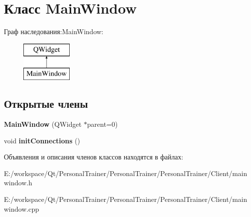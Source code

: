 \hypertarget{class_main_window}{}\section{Класс Main\+Window}
\label{class_main_window}
Граф наследования\+:Main\+Window\+:\begin{figure}[H]
\begin{center}
\leavevmode
\includegraphics[height=2.000000cm]{class_main_window}
\end{center}
\end{figure}
\subsection*{Открытые члены}
\begin{DoxyCompactItemize}
\item 
\hypertarget{class_main_window_a8b244be8b7b7db1b08de2a2acb9409db}{}\label{class_main_window_a8b244be8b7b7db1b08de2a2acb9409db} 
{\bfseries Main\+Window} (Q\+Widget $\ast$parent=0)
\item 
\hypertarget{class_main_window_aecba599b372d9fdf89dfbc1f4a060019}{}\label{class_main_window_aecba599b372d9fdf89dfbc1f4a060019} 
void {\bfseries init\+Connections} ()
\end{DoxyCompactItemize}


Объявления и описания членов классов находятся в файлах\+:\begin{DoxyCompactItemize}
\item 
E\+:/workspace/\+Qt/\+Personal\+Trainer/\+Personal\+Trainer/\+Personal\+Trainer/\+Client/mainwindow.\+h\item 
E\+:/workspace/\+Qt/\+Personal\+Trainer/\+Personal\+Trainer/\+Personal\+Trainer/\+Client/mainwindow.\+cpp\end{DoxyCompactItemize}
